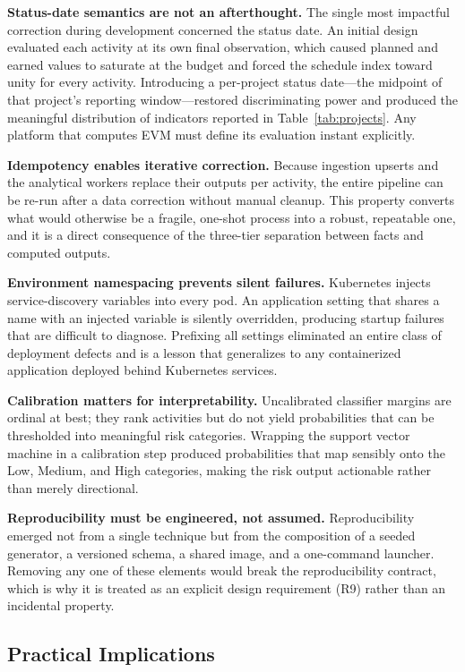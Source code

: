\documentclass[conference]{IEEEtran}
\begin{document}
\textbf{Status-date semantics are not an afterthought.} The single most impactful correction during development concerned the status date. An initial design evaluated each activity at its own final observation, which caused planned and earned values to saturate at the budget and forced the schedule index toward unity for every activity. Introducing a per-project status date---the midpoint of that project's reporting window---restored discriminating power and produced the meaningful distribution of indicators reported in Table~\ref{tab:projects}. Any platform that computes EVM must define its evaluation instant explicitly.

\textbf{Idempotency enables iterative correction.} Because ingestion upserts and the analytical workers replace their outputs per activity, the entire pipeline can be re-run after a data correction without manual cleanup. This property converts what would otherwise be a fragile, one-shot process into a robust, repeatable one, and it is a direct consequence of the three-tier separation between facts and computed outputs.

\textbf{Environment namespacing prevents silent failures.} Kubernetes injects service-discovery variables into every pod. An application setting that shares a name with an injected variable is silently overridden, producing startup failures that are difficult to diagnose. Prefixing all settings eliminated an entire class of deployment defects and is a lesson that generalizes to any containerized application deployed behind Kubernetes services.

\textbf{Calibration matters for interpretability.} Uncalibrated classifier margins are ordinal at best; they rank activities but do not yield probabilities that can be thresholded into meaningful risk categories. Wrapping the support vector machine in a calibration step produced probabilities that map sensibly onto the Low, Medium, and High categories, making the risk output actionable rather than merely directional.

\textbf{Reproducibility must be engineered, not assumed.} Reproducibility emerged not from a single technique but from the composition of a seeded generator, a versioned schema, a shared image, and a one-command launcher. Removing any one of these elements would break the reproducibility contract, which is why it is treated as an explicit design requirement (R9) rather than an incidental property.

\subsection{Practical Implications}
\end{document}

